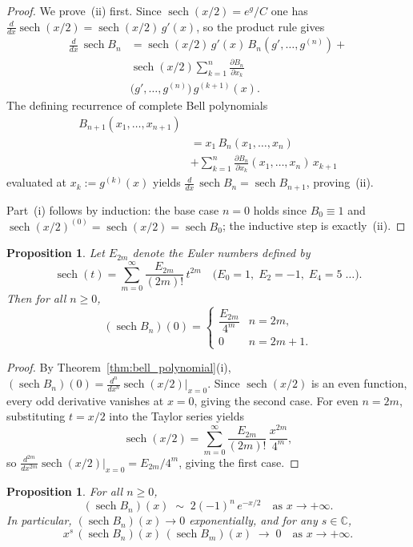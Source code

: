 \documentclass[article]{article}
\theoremstyle{plain}
\newtheorem{proposition}[theorem]{Proposition}
\theoremstyle{definition}
\newcommand{\C}{\mathbb{C}}
\DeclareMathOperator{\sech}{sech}
\begin{document}
\begin{proof}
We prove~(ii) first.  Since $\sech(x/2)=e^{g}/C$ one has
$\frac{d}{dx}\sech(x/2)=\sech(x/2)\,g'(x)$, so the product rule gives
\begin{align*}
\frac{d}{dx}\,\sech B_{n}
&=\sech(x/2)\,g'(x)\,B_{n}(g',\ldots,g^{(n)}) +\\
 &\sech(x/2)\sum_{k=1}^{n}\frac{\partial B_{n}}{\partial x_{k}}\\
 &\!\bigl(g',\ldots,g^{(n)}\bigr)\,g^{(k+1)}(x).
\end{align*}
The defining recurrence of complete Bell polynomials \cite{BellPolynomialsCombo}
\begin{align*}
B_{n+1}(x_{1},\ldots,x_{n+1}) \\
&=x_{1}\,B_{n}(x_{1},\ldots,x_{n}) \\
&+\sum_{k=1}^{n}\frac{\partial B_{n}}{\partial x_{k}}(x_{1},\ldots,x_{n})\,x_{k+1}
\end{align*}
evaluated at $x_{k}:=g^{(k)}(x)$ yields
$\frac{d}{dx}\,\sech B_{n}=\sech B_{n+1}$, proving~(ii).

Part~(i) follows by induction: the base case $n=0$ holds since $B_{0}\equiv 1$
and $\sech(x/2)^{(0)}=\sech(x/2)=\sech B_{0}$; the inductive step is exactly~(ii).
\end{proof}

\begin{proposition}\label{prop:parity}\label{prop:sech_bell_at_origin}
Let $E_{2m}$ denote the Euler numbers defined by
\[
  \sech(t)=\sum_{m=0}^{\infty}\frac{E_{2m}}{(2m)!}\,t^{2m}
  \quad\bigl(E_0=1,\;E_2=-1,\;E_4=5\;\ldots\bigr).
\]
Then for all $n\ge 0$,
\[
  (\sech B_{n})(0)
  =\begin{cases}
    \dfrac{E_{2m}}{4^{m}} & n=2m,\\[6pt]
    0 & n=2m+1.
  \end{cases}
\]
\end{proposition}

\begin{proof}
By Theorem~\ref{thm:bell_polynomial}(i), $(\sech B_{n})(0)=\frac{d^{n}}{dx^{n}}\sech(x/2)\big|_{x=0}$.
Since $\sech(x/2)$ is an even function, every odd derivative vanishes at $x=0$, giving the
second case.  For even $n=2m$, substituting $t=x/2$ into the Taylor series yields
\[
  \sech(x/2)=\sum_{m=0}^{\infty}\frac{E_{2m}}{(2m)!}\,\frac{x^{2m}}{4^{m}},
\]
so $\frac{d^{2m}}{dx^{2m}}\sech(x/2)\big|_{x=0}=E_{2m}/4^{m}$, giving the first case.
\end{proof}

\begin{proposition}\label{prop:sech_bell_at_infinity}
For all $n\ge 0$,
\[
  (\sech B_{n})(x) \;\sim\; 2(-1)^{n}\,e^{-x/2} \quad\text{as } x\to+\infty.
\]
In particular, $(\sech B_{n})(x)\to 0$ exponentially, and for any $s\in\C$,
\[
  x^{s}\,(\sech B_{n})(x)\,(\sech B_{m})(x)\;\to\;0
  \quad\text{as }x\to+\infty.
\]
\end{proposition}
\end{document}
